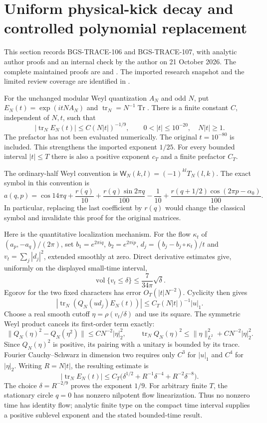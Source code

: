 \section{Uniform physical-kick decay and controlled polynomial replacement}
\label{sec:physical-kick-20261021}

This section records BGS-TRACE-106 and BGS-TRACE-107, with analytic author
proofs and an internal check by the author on 21 October 2026. The complete maintained
proofs are  and
.
The imported research snapshot and the limited review coverage are identified
in .

For the unchanged modular Weyl quantization $A_N$ and odd $N$, put
$E_N(t)=\exp(itNA_N)$ and $\operatorname{tr}_N=N^{-1}\operatorname{Tr}$.
There is a finite constant $C$, independent of $N,t$, such that
\[
 |\operatorname{tr}_N E_N(t)|\le C(N|t|)^{-1/9},\qquad
 0<|t|\le10^{-20},\quad N|t|\ge1.
\]
The prefactor has not been evaluated numerically. The original
$t=10^{-80}$ is included. This strengthens the imported exponent $1/25$.
For every bounded interval $|t|\le T$ there is also a positive exponent
$c_T$ and a finite prefactor $C_T$.

The ordinary-half Weyl convention is
$\mathsf W_N(k,l)=(-1)^{kl}T_N(l,k)$.
The exact symbol in this convention is
\[
 a(q,p)=\cos14\pi q+\frac{r(q)}{10}
 +\frac{r(q)\sin2\pi q}{100}-\frac1{10}
 +\frac{r(q+1/2)\cos(2\pi p-\alpha_0)}{100}.
\]
In particular, replacing the last coefficient by $r(q)$ would change
the classical symbol and invalidate this proof for the original matrices.

Here is the quantitative localization mechanism. For the flow $\kappa_t$
of $(a_p,-a_q)/(2\pi)$, set $b_1=e^{2\pi iq}$, $b_2=e^{2\pi ip}$,
$d_j=(b_j-b_j\circ\kappa_t)/t$ and $v_t=\sum_j|d_j|^2$, extended
smoothly at zero. Direct derivative estimates give, uniformly on the
displayed small-time interval,
\[
 \operatorname{vol}\{v_t\le\delta\}\le\frac7{34\pi}\sqrt\delta.
\]
Egorov for the two fixed characters has error $O_T(|t|N^{-2})$.
Cyclicity then gives
\[
 |\operatorname{tr}_N(Q_N(ud_j)E_N(t))|
 \le C_T(N|t|)^{-1}|u|_1.
\]
Choose a real smooth cutoff $\eta=\rho(v_t/\delta)$ and use its square.
The symmetric Weyl product cancels its first-order term exactly:
\[
 \|Q_N(\eta)^2-Q_N(\eta^2)\|
 \le C N^{-2}|\eta|_2^2,
 \qquad
 \operatorname{tr}_N Q_N(\eta)^2
 \le\|\eta\|_{L^2}^2+C N^{-2}|\eta|_2^2.
\]
Since $Q_N(\eta)^2$ is positive, its pairing with a unitary is bounded
by its trace. Fourier Cauchy--Schwarz in dimension two requires only
$C^3$ for $|u|_1$ and $C^4$ for $|\eta|_2$.
Writing $R=N|t|$, the resulting estimate is
\[
 |\operatorname{tr}_N E_N(t)|
 \le C_T\bigl(\delta^{1/2}+R^{-1}\delta^{-4}
                         +R^{-2}\delta^{-8}\bigr).
\]
The choice $\delta=R^{-2/9}$ proves the exponent $1/9$.
For arbitrary finite $T$, the stationary circle $q=0$ has nonzero
nilpotent flow linearization. Thus no nonzero time has identity flow;
analytic finite type on the compact time interval supplies a positive
sublevel exponent and the stated bounded-time result.


